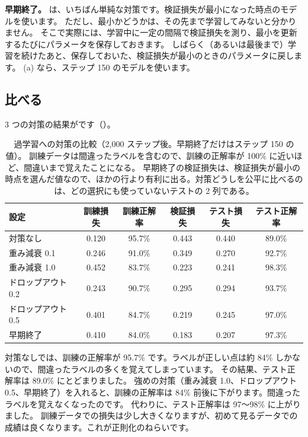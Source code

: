\textbf{早期終了。}
は、いちばん単純な対策です。検証損失が最小になった時点のモデルを使います。
ただし、最小かどうかは、その先まで学習してみないと分かりません。
そこで実際には、学習中に一定の間隔で検証損失を測り、最小を更新するたびにパラメータを保存しておきます。
しばらく（あるいは最後まで）学習を続けたあと、保存しておいた、検証損失が最小のときのパラメータに戻します。
(a) なら、ステップ 150 のモデルを使います。

\subsection*{比べる}

3 つの対策の結果がです（）。

\begin{table}[tbp]
\centering
\caption{過学習への対策の比較（2,000 ステップ後。早期終了だけはステップ 150 の値）。
訓練データは間違ったラベルを含むので、訓練の正解率が 100\% に近いほど、間違いまで覚えたことになる。
早期終了の検証損失は、検証損失が最小の時点を選んだ値なので、ほかの行より有利に出る。対策どうしを公平に比べるのは、どの選択にも使っていないテストの 2 列である。}
\label{tab:training-regularization}
\small
\begin{tabular}{lccccc}
\toprule
設定 & 訓練損失 & 訓練正解率 & 検証損失 & テスト損失 & テスト正解率 \\
\midrule
対策なし & 0.120 & 95.7\% & 0.443 & 0.440 & 89.0\% \\
重み減衰 0.1 & 0.246 & 91.0\% & 0.349 & 0.270 & 92.7\% \\
重み減衰 1.0 & 0.452 & 83.7\% & 0.223 & 0.241 & 98.3\% \\
ドロップアウト 0.2 & 0.243 & 90.7\% & 0.295 & 0.294 & 93.7\% \\
ドロップアウト 0.5 & 0.401 & 84.7\% & 0.219 & 0.245 & 97.0\% \\
早期終了 & 0.410 & 84.0\% & 0.183 & 0.207 & 97.3\% \\
\bottomrule
\end{tabular}
\end{table}

対策なしでは、訓練の正解率が 95.7\% です。ラベルが正しい点は約 84\% しかないので、間違ったラベルの多くを覚えてしまっています。
その結果、テスト正解率は 89.0\% にとどまりました。
強めの対策（重み減衰 1.0、ドロップアウト 0.5、早期終了）を入れると、訓練の正解率は 84\% 前後に下がります。間違ったラベルを覚えなくなったのです。
代わりに、テスト正解率は 97〜98\% に上がりました。
訓練データでの損失は少し大きくなりますが、初めて見るデータでの成績は良くなります。これが正則化のねらいです。

